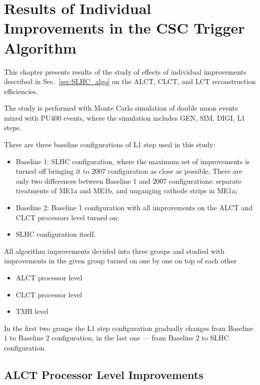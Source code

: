 \section{Results of Individual Improvements in the CSC Trigger Algorithm}
\label{sec:SLHC_algo_results}

This chapter presents results of the study of effects of individual improvements described in Sec.~\ref{sec:SLHC_algo} on the ALCT, CLCT, and LCT reconstruction efficiencies.

The study is performed with Monte Carlo simulation of double muon events mixed with PU400 events, where the simulation includes GEN, SIM, DIGI, L1 steps.

Three are three baseline configurations of L1 step used in this study:
\begin{itemize}
	\item Baseline 1: SLHC configuration, where the maximum set of improvements is turned off bringing it to 2007 configuration as close as possible. 
	There are only two differences between Baseline 1 and 2007 configurations: separate treatments of ME1a and ME1b, and unganging cathode strips in ME1a;
	\item Baseline 2: Baseline 1 configuration with all improvements on the ALCT and CLCT processors level turned on;
	\item SLHC configuration itself.
\end{itemize}

All algorithm improvements devided into three groups and studied with improvements in the given group turned on one by one on top of each other
\begin{itemize}
	\item ALCT processor level
	\item CLCT processor level
	\item TMB level
\end{itemize}

In the first two groups the L1 step configuration gradually changes from Baseline 1 to Baseline 2 configuration, in the last one --- from Baseline 2 to SLHC configuration.

\newpage

\subsection{ALCT Processor Level Improvements}


